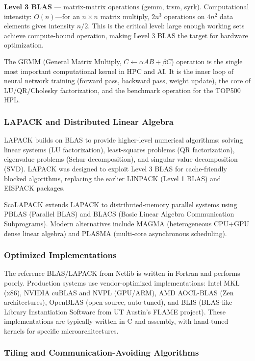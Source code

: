 \documentclass[11pt,letterpaper]{article}
\begin{document}
\textbf{Level 3 BLAS} --- matrix-matrix operations (gemm, trsm, syrk). Computational intensity: $O(n)$---for an $n \times n$ matrix multiply, $2n^3$ operations on $4n^2$ data elements gives intensity $n/2$. This is the critical level: large enough working sets achieve compute-bound operation, making Level 3 BLAS the target for hardware optimization.

The GEMM (General Matrix Multiply, $C \leftarrow \alpha AB + \beta C$) operation is the single most important computational kernel in HPC and AI. It is the inner loop of neural network training (forward pass, backward pass, weight update), the core of LU/QR/Cholesky factorization, and the benchmark operation for the TOP500 HPL.

\subsubsection{LAPACK and Distributed Linear Algebra}

LAPACK builds on BLAS to provide higher-level numerical algorithms: solving linear systems (LU factorization), least-squares problems (QR factorization), eigenvalue problems (Schur decomposition), and singular value decomposition (SVD). LAPACK was designed to exploit Level 3 BLAS for cache-friendly blocked algorithms, replacing the earlier LINPACK (Level 1 BLAS) and EISPACK packages.

ScaLAPACK extends LAPACK to distributed-memory parallel systems using PBLAS (Parallel BLAS) and BLACS (Basic Linear Algebra Communication Subprograms). Modern alternatives include MAGMA (heterogeneous CPU+GPU dense linear algebra) and PLASMA (multi-core asynchronous scheduling).

\subsubsection{Optimized Implementations}

The reference BLAS/LAPACK from Netlib is written in Fortran and performs poorly. Production systems use vendor-optimized implementations: Intel MKL (x86), NVIDIA cuBLAS and NVPL (GPU/ARM), AMD AOCL-BLAS (Zen architectures), OpenBLAS (open-source, auto-tuned), and BLIS (BLAS-like Library Instantiation Software from UT Austin's FLAME project). These implementations are typically written in C and assembly, with hand-tuned kernels for specific microarchitectures.

\subsubsection{Tiling and Communication-Avoiding Algorithms}
\end{document}
